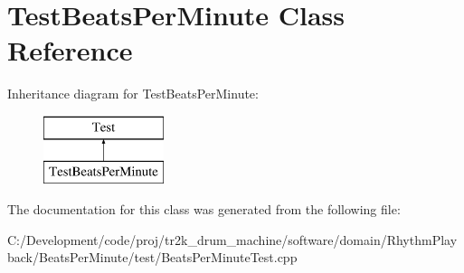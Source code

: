 \hypertarget{class_test_beats_per_minute}{}\section{Test\+Beats\+Per\+Minute Class Reference}
\label{class_test_beats_per_minute}
Inheritance diagram for Test\+Beats\+Per\+Minute\+:\begin{figure}[H]
\begin{center}
\leavevmode
\includegraphics[height=2.000000cm]{class_test_beats_per_minute}
\end{center}
\end{figure}


The documentation for this class was generated from the following file\+:\begin{DoxyCompactItemize}
\item 
C\+:/\+Development/code/proj/tr2k\+\_\+drum\+\_\+machine/software/domain/\+Rhythm\+Playback/\+Beats\+Per\+Minute/test/Beats\+Per\+Minute\+Test.\+cpp\end{DoxyCompactItemize}
